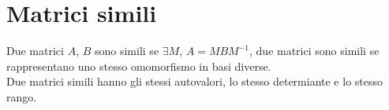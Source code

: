 \section{Matrici simili}
Due matrici $A$, $B$ sono simili se $\exists M$, $A=MBM^{-1}$, due matrici sono simili se rappresentano uno stesso omomorfismo in basi diverse. \\
Due matrici simili hanno gli stessi autovalori, lo stesso determiante e lo stesso rango. \\
